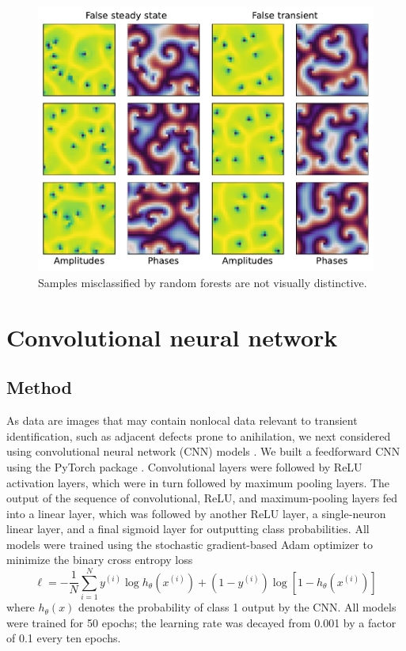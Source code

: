 \documentclass[nofootinbib,pre,superscriptaddress,twocolumn,longbibliography,floatfix]{revtex4-2}
\begin{document}
\begin{figure}[h]
    \centering
    \includegraphics[width=1.0\linewidth]{../figures/rf_misclassified.pdf}
    \caption{Samples misclassified by random forests are not visually distinctive.}
    \label{fig:rf_misclassified}
\end{figure}

\section{Convolutional neural network}
\subsection{Method}
As data are images that may contain nonlocal data relevant to transient identification,
such as adjacent defects prone to anihilation, we next considered using convolutional neural network (CNN) models \cite{lecun2015deep}.
We built a feedforward CNN using the PyTorch package \cite{paszke2019pytorch}.
Convolutional layers were followed by ReLU activation layers, which were in turn followed by maximum pooling layers.
The output of the sequence of convolutional, ReLU, and maximum-pooling layers fed into a linear layer,
which was followed by another ReLU layer, a single-neuron linear layer, and a final sigmoid layer for outputting class probabilities.
All models were trained using the stochastic gradient-based Adam optimizer \cite{kingma2015adam} to minimize the binary cross entropy loss
\begin{equation}
    \ell = -\frac{1}{N}\sum_{i=1}^N y^{(i)}\log h_\theta (x^{(i)})+(1-y^{(i)})\log[1-h_\theta (x^{(i)})]
\end{equation}
where $h_\theta (x)$ denotes the probability of class 1 output by the CNN.
All models were trained for 50 epochs; the learning rate was decayed from 0.001 by a factor of 0.1 every ten epochs.
\end{document}
